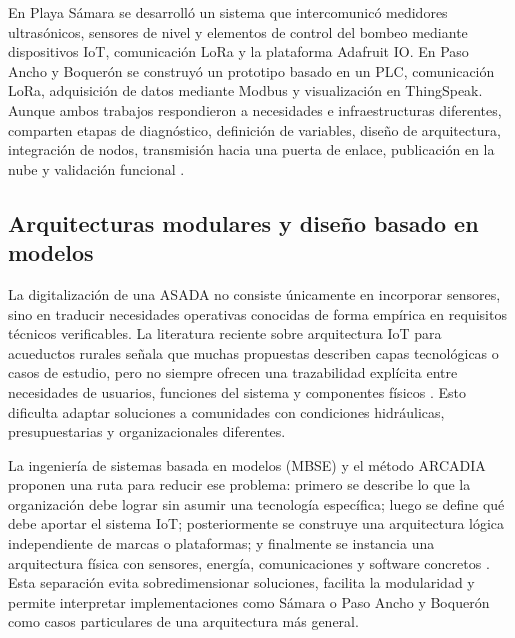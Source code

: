 \documentclass[12pt,letterpaper]{article}
\begin{document}
En Playa Sámara se desarrolló un sistema que intercomunicó medidores ultrasónicos, sensores de nivel y elementos de control del bombeo mediante dispositivos IoT, comunicación LoRa y la plataforma Adafruit IO. En Paso Ancho y Boquerón se construyó un prototipo basado en un PLC, comunicación LoRa, adquisición de datos mediante Modbus y visualización en ThingSpeak. Aunque ambos trabajos respondieron a necesidades e infraestructuras diferentes, comparten etapas de diagnóstico, definición de variables, diseño de arquitectura, integración de nodos, transmisión hacia una puerta de enlace, publicación en la nube y validación funcional \cite{solorzano2021,oviedo2024}.

\subsection{Arquitecturas modulares y diseño basado en modelos}
La digitalización de una ASADA no consiste únicamente en incorporar sensores, sino en traducir necesidades operativas conocidas de forma empírica en requisitos técnicos verificables. La literatura reciente sobre arquitectura IoT para acueductos rurales señala que muchas propuestas describen capas tecnológicas o casos de estudio, pero no siempre ofrecen una trazabilidad explícita entre necesidades de usuarios, funciones del sistema y componentes físicos \cite{arguedas2025}. Esto dificulta adaptar soluciones a comunidades con condiciones hidráulicas, presupuestarias y organizacionales diferentes.

La ingeniería de sistemas basada en modelos (MBSE) y el método ARCADIA proponen una ruta para reducir ese problema: primero se describe lo que la organización debe lograr sin asumir una tecnología específica; luego se define qué debe aportar el sistema IoT; posteriormente se construye una arquitectura lógica independiente de marcas o plataformas; y finalmente se instancia una arquitectura física con sensores, energía, comunicaciones y software concretos \cite{voirin2018,arguedas2025}. Esta separación evita sobredimensionar soluciones, facilita la modularidad y permite interpretar implementaciones como Sámara o Paso Ancho y Boquerón como casos particulares de una arquitectura más general.
\end{document}
